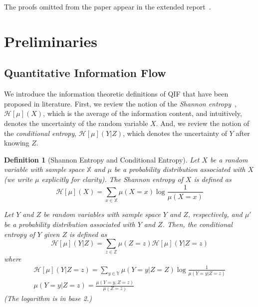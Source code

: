 \documentclass[]{eptcs}
\newtheorem{definition}[theorem]{Definition}
\newcommand{\addappendix}[2]{#2}
\begin{document}
\addappendix{The proofs omitted from the main body of the paper appear
  in the Appendix.}{The proofs omitted from the paper appear in the
  extended report~\cite{longversion}.}

\section{Preliminaries}

\subsection{Quantitative Information Flow}

We introduce the information theoretic definitions of QIF that have
been proposed in literature.  First, we review the notion of the {\em
  Shannon entropy}~\cite{shannon48}, $\mathcal{H}[\mu](X)$, which is
the average of the information content, and intuitively, denotes the
uncertainty of the random variable $X$.  And, we review the notion of
the {\em conditional entropy}, $\mathcal{H}[\mu](Y|Z)$, which denotes
the uncertainty of $Y$ after knowing $Z$.
\begin{definition}[Shannon Entropy and Conditional Entropy]
  Let $X$ be a random variable with sample space $\mathbb X$ and $\mu$
  be a probability distribution associated with $X$ (we write $\mu$
  explicitly for clarity).  The Shannon entropy of $X$ is defined as
\[
\mathcal{H}[\mu](X)=\sum_{x\in\mathbb{X}} \mu(X=x)\log\frac{1}{\mu(X=x)}
\]

Let $Y$ and $Z$ be random variables with sample space $Y$ and $Z$,
respectively, and $\mu'$ be a probability distribution associated with
$Y$ and $Z$.  Then, the conditional entropy of $Y$ given $Z$ is
defined as
\[
\mathcal{H}[\mu](Y|Z)=\sum_{z\in\mathbb Z} \mu(Z=z) \mathcal{H}[\mu](Y|Z=z)
\]
where
\[
\begin{array}{l}
\mathcal{H}[\mu](Y|Z=z)=\sum_{y\in\mathbb Y} \mu(Y=y|Z=Z)\log\frac{1}{\mu(Y=y|Z=z)} \\
  \mu(Y=y|Z=z)=\frac{\mu(Y=y,Z=z)}{\mu(Z=z)}
\end{array}
\]
(The logarithm is in base 2.)
\end{definition}
\end{document}
